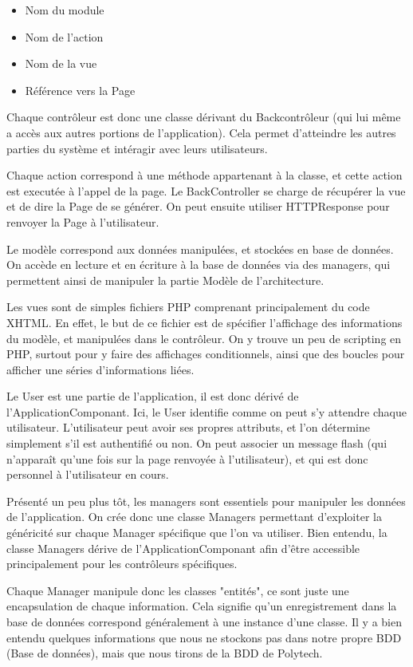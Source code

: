     \begin{itemize}
    \item Nom du module
    \item Nom de l'action
    \item Nom de la vue
    \item Référence vers la Page
    \end{itemize}

Chaque contrôleur est donc une classe dérivant du Backcontrôleur (qui lui même a accès aux autres portions de l'application).
Cela permet d'atteindre les autres parties du système et intéragir avec leurs utilisateurs.

Chaque action correspond à une méthode appartenant à la classe, et cette action est executée à l'appel de la page.
Le BackController se charge de récupérer la vue et de dire la Page de se générer. On peut ensuite utiliser HTTPResponse pour
renvoyer la Page à l'utilisateur.

Le modèle correspond aux données manipulées, et stockées en base de données. On accède en lecture et en écriture à la base de données
via des managers, qui permettent ainsi de manipuler la partie Modèle de l'architecture.

Les vues sont de simples fichiers PHP comprenant principalement du code XHTML. En effet, le but de ce fichier est de spécifier
l'affichage des informations du modèle, et manipulées dans le contrôleur. On y trouve un peu de scripting en PHP, surtout
pour y faire des affichages conditionnels, ainsi que des boucles pour afficher une séries d'informations liées.

Le User est une partie de l'application, il est donc dérivé de l'ApplicationComponant. Ici, le User identifie comme on peut
s'y attendre chaque utilisateur. L'utilisateur peut avoir ses propres attributs, et l'on détermine simplement s'il est authentifié
ou non. On peut associer un message flash (qui n'apparaît qu'une fois sur la page renvoyée à l'utilisateur), et qui est donc personnel
à l'utilisateur en cours.

Présenté un peu plus tôt, les managers sont essentiels pour manipuler les données de l'application. On crée donc une classe
Managers permettant d'exploiter la généricité sur chaque Manager spécifique que l'on va utiliser. Bien entendu, la classe
Managers dérive de l'ApplicationComponant afin d'être accessible principalement pour les contrôleurs spécifiques.

Chaque Manager manipule donc les classes "entités", ce sont juste une encapsulation de chaque information. Cela signifie
qu'un enregistrement dans la base de données correspond généralement à une instance d'une classe. Il y a bien entendu quelques
informations que nous ne stockons pas dans notre propre BDD (Base de données), mais que nous tirons de la BDD de Polytech.


